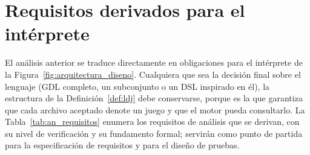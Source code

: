 \section{Requisitos derivados para el intérprete}
\label{sec:an_requisitos_lenguaje}

El análisis anterior se traduce directamente en obligaciones para el intérprete de la Figura~\ref{fig:arquitectura_diseno}. Cualquiera que sea la decisión final sobre el lenguaje (GDL completo, un subconjunto o un DSL inspirado en él), la estructura de la Definición~\ref{def:ldj} debe conservarse, porque es la que garantiza que cada archivo aceptado denote un juego y que el motor pueda consultarlo. La Tabla~\ref{tab:an_requisitos} enumera los requisitos de análisis que se derivan, con su nivel de verificación y su fundamento formal; servirán como punto de partida para la especificación de requisitos y para el diseño de pruebas.

